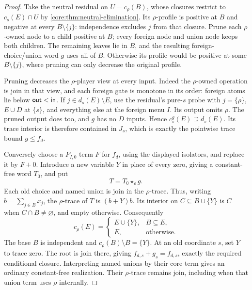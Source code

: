 \begin{proof}
Take the neutral residual on $U=c_\rho(B)$, whose closures restrict
to $c_s(E)\cap U$ by \cref{core:thm:neutral-elimination}.
Its $\rho$-profile is positive at $B$ and negative at every
$B\setminus\{j\}$: independence excludes $j$ from that closure.
Prune each $\rho$-owned node to a child positive at $B$; every foreign
node and union node keeps both children. The remaining leaves lie in
$B$, and the resulting foreign-choice/union word $g$ uses all of $B$.
Otherwise its profile would be positive at some $B\setminus\{j\}$,
where pruning can only decrease the original profile.

Pruning decreases the $\rho$-player view at every input. Indeed the
$\rho$-owned operation is join in that view, and each foreign gate
is monotone in its order: foreign atoms lie below $\mathsf{out}<\mathsf{in}$.
If $j\in d_s(E)\setminus E$, use the residual's pure-$s$ probe with
$j=\{\rho\}$, $E\cup D$ at $\{s\}$, and everything else at the
foreign menu $I$. Its output omits $\rho$.
The pruned output does too, and $g$ has no $D$ inputs. Hence
$c_s^g(E)\supseteq d_s(E)$. Its trace interior is therefore contained
in $J_s$, which is exactly the pointwise trace bound $g\leq f_d$.

Conversely choose a $P_{I,0}$ term $F$ for $f_d$, using the displayed
isolators, and replace it by $F+0$. Introduce a new variable $Y$ in
place of every zero, giving a constant-free word $T_0$, and put
\[
 T=T_0\star_\rho g.
\]
Each old choice and named union is join in the $\rho$-trace. Thus,
writing $b=\sum_{j\in B}x_j$, the $\rho$-trace of $T$ is
$(b+Y)b$. Its interior on $C\subseteq B\cup\{Y\}$ is $C$ when
$C\cap B\ne\varnothing$, and empty otherwise. Consequently
\[
 c_\rho(E)=
 \begin{cases}E\cup\{Y\},&B\subseteq E,\\E,&\text{otherwise}.
 \end{cases}
\]
The base $B$ is independent and $c_\rho(B)\setminus B=\{Y\}$.
At an old coordinate $s$, set $Y$ to trace zero. The root is join
there, giving $f_{d,s}+g_s=f_{d,s}$, exactly the required conditional
closure. Interpreting named unions by their core term gives an ordinary
constant-free realization. Their $\rho$-trace remains join, including
when that union term uses $\rho$ internally.
\end{proof}

